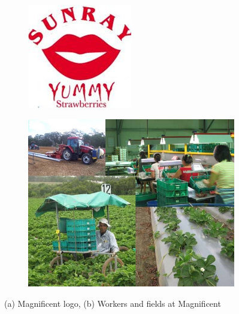 \documentclass[fleqn,twoside,12pt]{report}
\begin{document}
\begin{figure}[h]
	\centering
	\begin{subfigure}{.4\textwidth}
		\centering
		\includegraphics[width=.6\linewidth]{sunray.jpg}
		\caption{}
		\label{fig:sunray}
	\end{subfigure}%
	\begin{subfigure}{.6\textwidth}
		\centering
		\includegraphics[width=.8\linewidth]{whatwedo.png}
		\caption{}
		\label{fig:whatwedo}
	\end{subfigure}%
	\caption{(a) Magnificent logo, (b) Workers and fields at Magnificent}
	\label{fig:test}
\end{figure}
\end{document}
